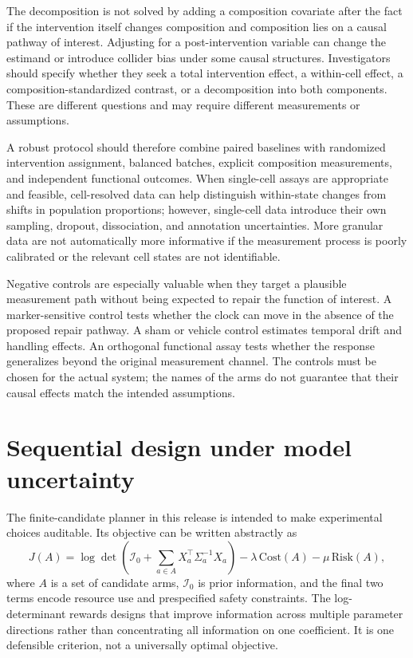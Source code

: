 \documentclass[10pt,a4paper]{article}
\begin{document}
The decomposition is not solved by adding a composition covariate after the fact if the intervention itself changes composition and composition lies on a causal pathway of interest. Adjusting for a post-intervention variable can change the estimand or introduce collider bias under some causal structures. Investigators should specify whether they seek a total intervention effect, a within-cell effect, a composition-standardized contrast, or a decomposition into both components. These are different questions and may require different measurements or assumptions.

A robust protocol should therefore combine paired baselines with randomized intervention assignment, balanced batches, explicit composition measurements, and independent functional outcomes. When single-cell assays are appropriate and feasible, cell-resolved data can help distinguish within-state changes from shifts in population proportions; however, single-cell data introduce their own sampling, dropout, dissociation, and annotation uncertainties. More granular data are not automatically more informative if the measurement process is poorly calibrated or the relevant cell states are not identifiable.

Negative controls are especially valuable when they target a plausible measurement path without being expected to repair the function of interest. A marker-sensitive control tests whether the clock can move in the absence of the proposed repair pathway. A sham or vehicle control estimates temporal drift and handling effects. An orthogonal functional assay tests whether the response generalizes beyond the original measurement channel. The controls must be chosen for the actual system; the names of the arms do not guarantee that their causal effects match the intended assumptions.

\section{Sequential design under model uncertainty}
The finite-candidate planner in this release is intended to make experimental choices auditable. Its objective can be written abstractly as
\[
J(A)=\log\det\!\left(\mathcal I_0+\sum_{a\in A}X_a^\top\Sigma_a^{-1}X_a\right)
-\lambda\,\mathrm{Cost}(A)-\mu\,\mathrm{Risk}(A),
\]
where \(A\) is a set of candidate arms, \(\mathcal I_0\) is prior information, and the final two terms encode resource use and prespecified safety constraints. The log-determinant rewards designs that improve information across multiple parameter directions rather than concentrating all information on one coefficient. It is one defensible criterion, not a universally optimal objective.
\end{document}
